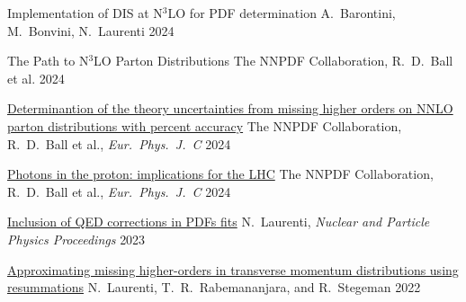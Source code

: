 
\begin{cvhonors}

    \cvhonor
    {Implementation of DIS at N$^3$LO for PDF determination} %
    {A.\ Barontini, M.\ Bonvini, N.\ Laurenti} %
    {}
    {2024}
    
    \cvhonor
    {The Path to N$^3$LO Parton Distributions} %
    {The NNPDF Collaboration, R.\ D.\ Ball et al.} %
    {}
    {2024}
    
    \cvhonor
    {\href{https://arxiv.org/pdf/2401.10319.pdf}{Determinantion of the theory uncertainties from missing higher orders on NNLO parton distributions with percent accuracy}} %
    {The NNPDF Collaboration, R.\ D.\ Ball et al., \emph{Eur.\ Phys.\ J.\ C}} %
    {}
    {2024}
    
    \cvhonor
    {\href{https://arxiv.org/pdf/2401.08749.pdf}{Photons in the proton: implications for the LHC}} %
    {The NNPDF Collaboration, R.\ D.\ Ball et al., \emph{Eur.\ Phys.\ J.\ C}} %
    {}
    {2024}

    \cvhonor
    {\href{https://doi.org/10.1016/j.nuclphysbps.2023.11.013}{Inclusion of QED corrections in PDFs ﬁts}}
    {N.\ Laurenti, \textit{Nuclear and Particle Physics Proceedings}}
    {}
    {2023}
    
    \cvhonor
    {\href{https://arxiv.org/abs/2207.12265}{Approximating missing higher-orders in transverse momentum distributions using resummations}}
    {N.~Laurenti, T.\ R.\ Rabemananjara, and R.\ Stegeman}
    {}
    {2022}

\end{cvhonors}